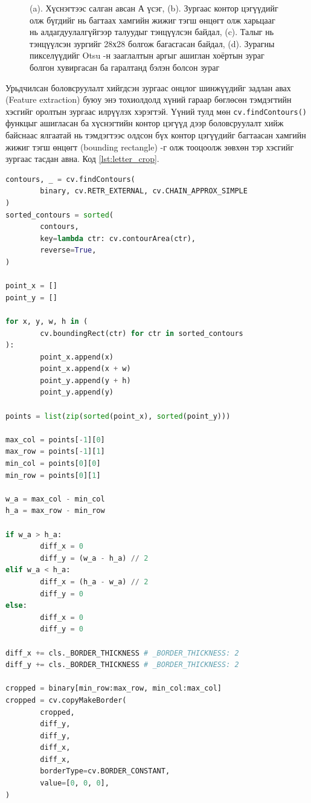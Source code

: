 \begin{figure}[ht]
	\caption{(a). Хүснэгтээс салган авсан А үсэг, (b). Зургаас контор цэгүүдийг олж бүгдийг нь багтаах хамгийн жижиг тэгш өнцөгт олж харьцааг нь алдагдуулалгүйгээр талуудыг тэнцүүлсэн байдал, (c). Талыг нь тэнцүүлсэн зургийг 28х28 болгож багасгасан байдал, (d). Зурагны пикселүүдийг Otsu -н зааглалтын аргыг ашиглан хоёртын зураг болгон хувиргасан ба гаралтанд бэлэн болсон зураг}
	\label{fig:letter_a}
\end{figure}

Урьдчилсан боловсруулалт хийгдсэн зургаас онцлог шинжүүдийг задлан авах (Feature extraction) буюу энэ тохиолдолд хүний гараар бөглөсөн тэмдэгтийн хэсгийг оролтын зургаас илрүүлэх хэрэгтэй. Үүний тулд мөн \texttt{cv.findContours()} функцыг ашигласан ба хүснэгтийн контор цэгүүд дээр боловсруулалт хийж байснаас ялгаатай нь тэмдэгтээс олдсон бүх контор цэгүүдийг багтаасан хамгийн жижиг тэгш өнцөгт (bounding rectangle) -г олж тооцоолж зөвхөн тэр хэсгийг зургаас тасдан авна. Код \ref{lst:letter_crop}.

\begin{lstlisting}[caption={Тэмдэгтээс контор цэгүүдийг олж бүгдийг нь багтаасан хамгийн жижиг тэгш өнцөгтөөр тасдан авах}, label={lst:letter_crop}, language=Python]
contours, _ = cv.findContours(
		binary, cv.RETR_EXTERNAL, cv.CHAIN_APPROX_SIMPLE
)
sorted_contours = sorted(
		contours,
		key=lambda ctr: cv.contourArea(ctr),
		reverse=True,
)

point_x = []
point_y = []

for x, y, w, h in (
		cv.boundingRect(ctr) for ctr in sorted_contours
):
		point_x.append(x)
		point_x.append(x + w)
		point_y.append(y + h)
		point_y.append(y)

points = list(zip(sorted(point_x), sorted(point_y)))

max_col = points[-1][0]
max_row = points[-1][1]
min_col = points[0][0]
min_row = points[0][1]

w_a = max_col - min_col
h_a = max_row - min_row

if w_a > h_a:
		diff_x = 0
		diff_y = (w_a - h_a) // 2
elif w_a < h_a:
		diff_x = (h_a - w_a) // 2
		diff_y = 0
else:
		diff_x = 0
		diff_y = 0

diff_x += cls._BORDER_THICKNESS # _BORDER_THICKNESS: 2
diff_y += cls._BORDER_THICKNESS # _BORDER_THICKNESS: 2

cropped = binary[min_row:max_row, min_col:max_col]
cropped = cv.copyMakeBorder(
		cropped,
		diff_y,
		diff_y,
		diff_x,
		diff_x,
		borderType=cv.BORDER_CONSTANT,
		value=[0, 0, 0],
)
\end{lstlisting}

